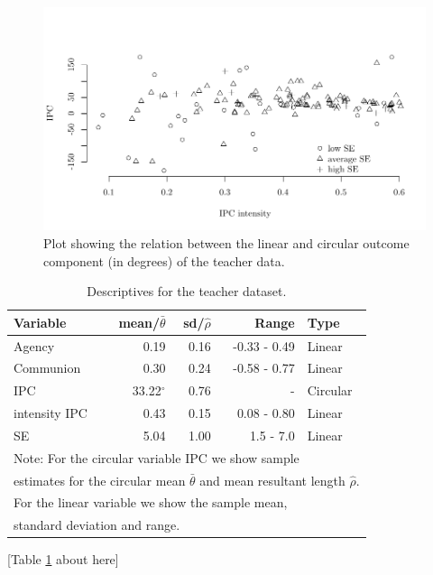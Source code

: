\documentclass[man,mask]{apa6}
\begin{document}
\begin{figure}
\centering
\includegraphics[width = \textwidth]{Plots/dataplot.pdf}
\caption{Plot showing the relation between the linear and circular outcome component (in degrees) of the teacher data.}
\label{dataplot}
\end{figure}

\begin{table}[h]
\centering
\caption{Descriptives for the teacher dataset.} 
\begin{tabular}{lrrrl}
  \noalign{\smallskip}\hline\noalign{\smallskip}
Variable & mean/$\bar{\theta}$ & sd/$\hat{\rho}$ & Range & Type \\ \hline\noalign{\smallskip}
Agency & 0.19 & 0.16 & -0.33 - 0.49 & Linear\\
Communion & 0.30 & 0.24 & -0.58 - 0.77 & Linear\\
IPC &33.22$^\circ$& 0.76 & - & Circular\\
intensity IPC & 0.43 & 0.15 & 0.08 - 0.80 & Linear\\
SE & 5.04 & 1.00 & 1.5 - 7.0 & Linear\\
   \hline
\multicolumn{5}{l}{Note: For the circular variable IPC we show sample }\\
\multicolumn{5}{l}{estimates for the circular mean $\bar{\theta}$ and mean resultant length $\hat{\rho}$.}\\
\multicolumn{5}{l}{For the linear variable we show the sample mean,}\\
\multicolumn{5}{l}{standard deviation and range.}
\end{tabular}
\label{Tableteacherdescriptives}
\end{table}

\hfil \hspace{2cm} {[}Table \ref{Tableteacherdescriptives} about here{]} \hfil
\end{document}

